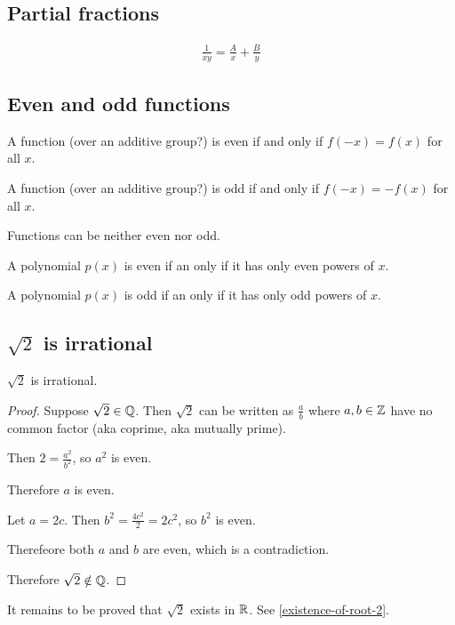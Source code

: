 \subsection{Partial fractions}

\begin{align*}
  \frac{1}{xy} = \frac{A}{x} + \frac{B}{y}
\end{align*}

\subsection{Even and odd functions}

\begin{definition*}
  A function (over an additive group?) is even if and only if $f(-x) = f(x)$ for all $x$.

  A function (over an additive group?) is odd if and only if $f(-x) = -f(x)$ for all $x$.
\end{definition*}

Functions can be neither even nor odd.

\begin{claim*}
  A polynomial $p(x)$ is even if an only if it has only even powers of $x$.

  A polynomial $p(x)$ is odd if an only if it has only odd powers of $x$.
\end{claim*}

\subsection{$\sqrt{2}$ is irrational}
\begin{claim*}
  $\sqrt{2}$ is irrational.
\end{claim*}

\begin{proof}
  Suppose $\sqrt{2} \in \mathbb{Q}$. Then $\sqrt{2}$ can be written as $\frac{a}{b}$ where $a, b \in \mathbb{Z}$
  have no common factor (aka coprime, aka mutually prime).

  Then $2 = \frac{a^2}{b^2}$, so $a^2$ is even.

  Therefore $a$ is even.

  Let $a = 2c$. Then $b^2 = \frac{4c^2}{2} = 2c^2$, so $b^2$ is even.

  Therefeore both $a$ and $b$ are even, which is a contradiction.

  Therefore $\sqrt{2} \notin \mathbb{Q}$.
\end{proof}

\begin{remark*}
  It remains to be proved that $\sqrt{2}$ exists in $\mathbb{R}$. See \ref{existence-of-root-2}.
\end{remark*}

